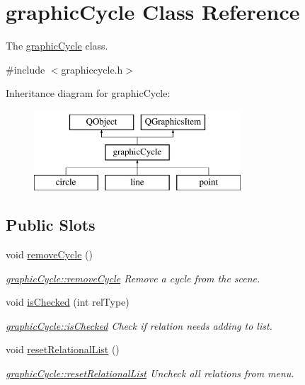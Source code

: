 \hypertarget{classgraphic_cycle}{}\section{graphic\+Cycle Class Reference}
\label{classgraphic_cycle}


The \mbox{\hyperlink{classgraphic_cycle}{graphic\+Cycle}} class.  




{\ttfamily \#include $<$graphiccycle.\+h$>$}

Inheritance diagram for graphic\+Cycle\+:\begin{figure}[H]
\begin{center}
\leavevmode
\includegraphics[height=3.000000cm]{classgraphic_cycle}
\end{center}
\end{figure}
\subsection*{Public Slots}
\begin{DoxyCompactItemize}
\item 
void \mbox{\hyperlink{classgraphic_cycle_aba3c23f4bce3028b9f4582dc2e145e1e}{remove\+Cycle}} ()
\begin{DoxyCompactList}\small\item\em \mbox{\hyperlink{classgraphic_cycle_aba3c23f4bce3028b9f4582dc2e145e1e}{graphic\+Cycle\+::remove\+Cycle}} Remove a cycle from the scene. \end{DoxyCompactList}\item 
void \mbox{\hyperlink{classgraphic_cycle_afd9910a819e64c8e3efafe91717a0a20}{is\+Checked}} (int rel\+Type)
\begin{DoxyCompactList}\small\item\em \mbox{\hyperlink{classgraphic_cycle_afd9910a819e64c8e3efafe91717a0a20}{graphic\+Cycle\+::is\+Checked}} Check if relation needs adding to list. \end{DoxyCompactList}\item 
\mbox{\label{classgraphic_cycle_a6d3281af145eb7d9edcd3eae6b229b9d}} 
void \mbox{\hyperlink{classgraphic_cycle_a6d3281af145eb7d9edcd3eae6b229b9d}{reset\+Relational\+List}} ()
\begin{DoxyCompactList}\small\item\em \mbox{\hyperlink{classgraphic_cycle_a6d3281af145eb7d9edcd3eae6b229b9d}{graphic\+Cycle\+::reset\+Relational\+List}} Uncheck all relations from menu. \end{DoxyCompactList}\end{DoxyCompactItemize}
